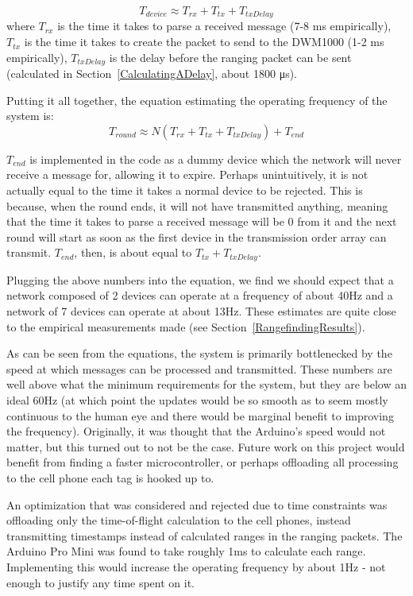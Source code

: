 \[
	T_{device} \approx T_{rx} + T_{tx} + T_{txDelay}
\]
where $T_{rx}$ is the time it takes to parse a received message (7-8 ms empirically), $T_{tx}$ is the time it takes to create the packet to send to the DWM1000 (1-2 ms empirically), $T_{txDelay}$ is the delay before the ranging packet can be sent (calculated in Section~\ref{CalculatingADelay}, about 1800 \si{\micro\second}).

Putting it all together, the equation estimating the operating frequency of the system is:
\[
	T_{round} \approx N(T_{rx} + T_{tx} + T_{txDelay}) + T_{end}
\]

$T_{end}$ is implemented in the code as a dummy device which the network will never receive a message for, allowing it to expire. Perhaps unintuitively, it is not actually equal to the time it takes a normal device to be rejected. This is because, when the round ends, it will not have transmitted anything, meaning that the time it takes to parse a received message will be 0 from it and the next round will start as soon as the first device in the transmission order array can transmit. $T_{end}$, then, is about equal to $T_{tx} + T_{txDelay}$.

Plugging the above numbers into the equation, we find we should expect that a network composed of 2 devices can operate at a frequency of about 40Hz and a network of 7 devices can operate at about 13Hz. These estimates are quite close to the empirical measurements made (see Section~\ref{RangefindingResults}).

As can be seen from the equations, the system is primarily bottlenecked by the speed at which messages can be processed and transmitted. These numbers are well above what the minimum requirements for the system, but they are below an ideal 60Hz (at which point the updates would be so smooth as to seem mostly continuous to the human eye and there would be marginal benefit to improving the frequency). Originally, it was thought that the Arduino's speed would not matter, but this turned out to not be the case. Future work on this project would benefit from finding a faster microcontroller, or perhaps offloading all processing to the cell phone each tag is hooked up to. 

An optimization that was considered and rejected due to time constraints was offloading only the time-of-flight calculation to the cell phones, instead transmitting timestamps instead of calculated ranges in the ranging packets. The Arduino Pro Mini was found to take roughly 1ms to calculate each range. Implementing this would increase the operating frequency by about 1Hz - not enough to justify any time spent on it.

